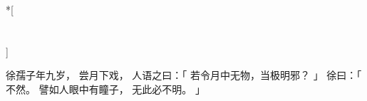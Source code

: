 
\switchcolumn[0]*[\section{}]

徐孺子年九岁，
尝月下戏，
人语之曰：「
    若令月中无物，当极明邪？
」
徐曰：「
    不然。
    譬如人眼中有瞳子，
    无此必不明。
」

\switchcolumn


